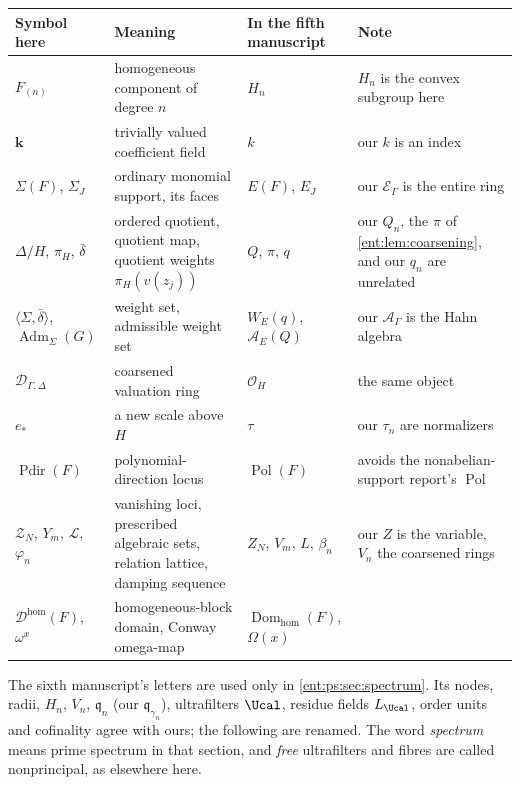 \documentclass[11pt]{article}
\theoremstyle{plain}
\theoremstyle{plain}
\theoremstyle{plain}
\theoremstyle{definition}
\theoremstyle{definition}
\theoremstyle{definition}
\theoremstyle{definition}
\theoremstyle{remark}
\newcommand{\E}{\mathcal E_\Gamma}
\newcommand{\A}{\mathcal A_\Gamma}\newcommand{\OO}{\mathcal O_\Gamma}
\newcommand{\Dom}{\mathcal D_{\Gamma,\Delta}}
\newcommand{\kk}{\mathbf k}\newcommand{\PP}{\mathbb P}
\DeclareMathOperator{\Pdir}{Pdir}\DeclareMathOperator{\Adm}{Adm}
\newcommand{\inner}[2]{\langle#1,#2\rangle}
\begin{document}
\begin{center}\small
\begin{tabularx}{\textwidth}{@{}P{0.2\textwidth}P{0.3\textwidth}P{0.17\textwidth}Y@{}}
\toprule
Symbol here & Meaning & In the fifth manuscript & Note\\\midrule
$F_{(n)}$ & homogeneous component of degree $n$ & $H_n$ & $H_n$ is the
convex subgroup here\\[0.3em]
$\kk$ & trivially valued coefficient field & $k$ & our $k$ is an
index\\[0.3em]
$\Sigma(F)$, $\Sigma_J$ & ordinary monomial support, its faces & $E(F)$,
$E_J$ & our $\E$ is the entire ring\\[0.3em]
$\Delta/H$, $\pi_H$, $\bar\delta$ & ordered quotient, quotient map,
quotient weights $\pi_H(v(z_j))$ & $Q$, $\pi$, $q$ & our $Q_n$, the $\pi$ of
\cref{ent:lem:coarsening}, and our $q_n$ are unrelated\\[0.3em]
$\inner\Sigma{\bar\delta}$, $\Adm_\Sigma(G)$ & weight set, admissible weight
set & $W_E(q)$, $\mathcal A_E(Q)$ & our $\A$ is the Hahn algebra\\[0.3em]
$\Dom$ & coarsened valuation ring & $\mathcal O_H$ & the same
object\\[0.3em]
$e_*$ & a new scale above $H$ & $\tau$ & our $\tau_n$ are
normalizers\\[0.3em]
$\Pdir(F)$ & polynomial-direction locus & $\operatorname{Pol}(F)$ & avoids
the nonabelian-support report's $\operatorname{Pol}$\\[0.3em]
$\mathcal Z_N$, $Y_m$, $\mathcal L$, $\varphi_n$ & vanishing loci,
prescribed algebraic sets, relation lattice, damping sequence & $Z_N$, $V_m$,
$L$, $\beta_n$ & our $Z$ is the variable, $V_n$ the coarsened rings\\[0.3em]
$\mathcal D^{\mathrm{hom}}(F)$, $\omega^x$ & homogeneous-block domain,
Conway omega-map & $\operatorname{Dom}_{\mathrm{hom}}(F)$, $\Omega(x)$ & \\
\bottomrule
\end{tabularx}
\end{center}

The sixth manuscript's letters are used only in \cref{ent:ps:sec:spectrum}.
Its nodes, radii, $H_n$, $V_n$, $\mathfrak q_n$ (our $\mathfrak
q_{\gamma_n}$), ultrafilters $\Ucal$, residue fields $L_\Ucal$, order units
and cofinality agree with ours; the following are renamed. The word
\emph{spectrum} means prime spectrum in that section, and \emph{free}
ultrafilters and fibres are called nonprincipal, as elsewhere here.
\end{document}
